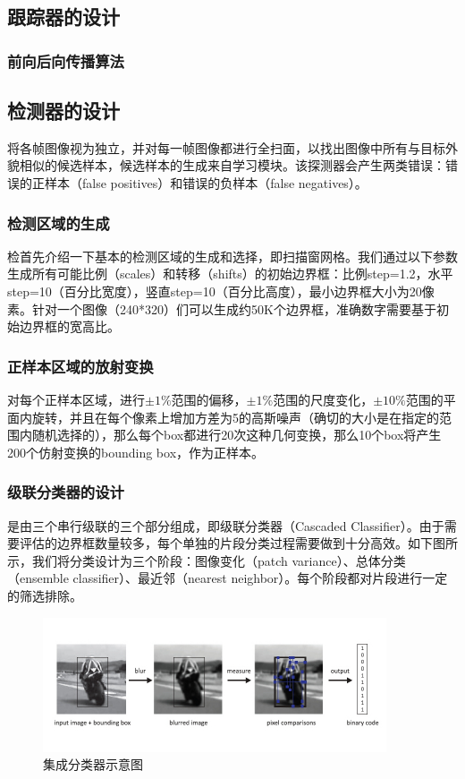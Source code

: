 \subsection{跟踪器的设计}
\subsubsection{前向后向传播算法}

\subsection{检测器的设计}
将各帧图像视为独立，并对每一帧图像都进行全扫面，以找出图像中所有与目标外貌相似的候选样本，候选样本的生成来自学习模块。该探测器会产生两类错误：错误的正样本（false positives）和错误的负样本（false negatives）。

\subsubsection{检测区域的生成}
检首先介绍一下基本的检测区域的生成和选择，即扫描窗网格。我们通过以下参数生成所有可能比例（scales）和转移（shifts）的初始边界框：比例step=1.2，水平step=10（百分比宽度），竖直step=10（百分比高度），最小边界框大小为20像素。针对一个图像（240*320）们可以生成约50K个边界框，准确数字需要基于初始边界框的宽高比。

\subsubsection{正样本区域的放射变换}
对每个正样本区域，进行$±1\%$范围的偏移，$±1\%$范围的尺度变化，$±10\%$范围的平面内旋转，并且在每个像素上增加方差为5的高斯噪声（确切的大小是在指定的范围内随机选择的），那么每个box都进行20次这种几何变换，那么10个box将产生200个仿射变换的bounding box，作为正样本。

\subsubsection{级联分类器的设计}
是由三个串行级联的三个部分组成，即级联分类器（Cascaded Classifier）。由于需要评估的边界框数量较多，每个单独的片段分类过程需要做到十分高效。如下图所示，我们将分类设计为三个阶段：图像变化（patch variance）、总体分类（ensemble classifier）、最近邻（nearest neighbor）。每个阶段都对片段进行一定的筛选排除。
\begin{figure}[htb]   
	\centering
	\includegraphics[width=\textwidth]{figs/161002_Thesis_Tracking_Section_04.pdf}
	\caption{集成分类器示意图}
	\label{fig:161002_Thesis_Tracking_Section_04}
\end{figure}

